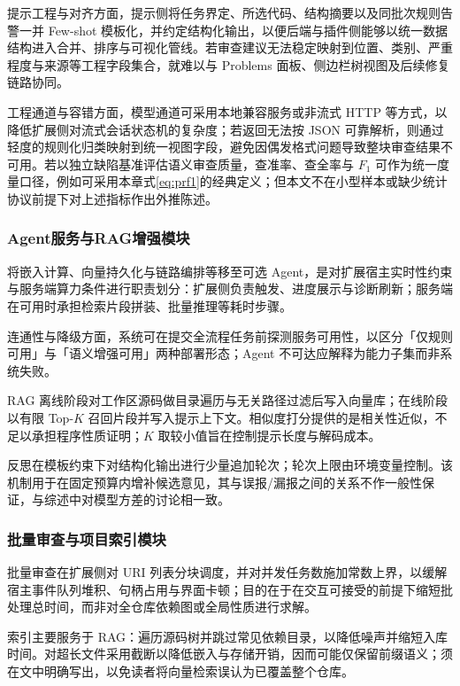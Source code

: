 提示工程与对齐方面，提示侧将任务界定、所选代码、结构摘要以及同批次规则告警一并 Few-shot 模板化，并约定结构化输出，以便后端与插件侧能够以统一数据结构进入合并、排序与可视化管线。若审查建议无法稳定映射到位置、类别、严重程度与来源等工程字段集合，就难以与 Problems 面板、侧边栏树视图及后续修复链路协同。

工程通道与容错方面，模型通道可采用本地兼容服务或非流式 HTTP 等方式，以降低扩展侧对流式会话状态机的复杂度；若返回无法按 JSON 可靠解析，则通过轻度的规则化归类映射到统一视图字段，避免因偶发格式问题导致整块审查结果不可用。若以独立缺陷基准评估语义审查质量，查准率、查全率与 $F_{1}$ 可作为统一度量口径，例如可采用本章式\eqref{eq:prf1}的经典定义；但本文不在小型样本或缺少统计协议前提下对上述指标作出外推陈述。

\subsubsection{Agent服务与RAG增强模块}

将嵌入计算、向量持久化与链路编排等移至可选 Agent，是对扩展宿主实时性约束与服务端算力条件进行职责划分：扩展侧负责触发、进度展示与诊断刷新；服务端在可用时承担检索片段拼装、批量推理等耗时步骤。

连通性与降级方面，系统可在提交全流程任务前探测服务可用性，以区分「仅规则可用」与「语义增强可用」两种部署形态；Agent 不可达应解释为能力子集而非系统失败。

RAG 离线阶段对工作区源码做目录遍历与无关路径过滤后写入向量库；在线阶段以有限 Top-$K$ 召回片段并写入提示上下文。相似度打分提供的是相关性近似，不足以承担程序性质证明；$K$ 取较小值旨在控制提示长度与解码成本\cite{lewis2020retrieval}。

反思在模板约束下对结构化输出进行少量追加轮次；轮次上限由环境变量控制。该机制用于在固定预算内增补候选意见，其与误报/漏报之间的关系不作一般性保证，与综述中对模型方差的讨论相一致\cite{hou2024llmse}。

\subsubsection{批量审查与项目索引模块}

批量审查在扩展侧对 URI 列表分块调度，并对并发任务数施加常数上界，以缓解宿主事件队列堆积、句柄占用与界面卡顿；目的在于在交互可接受的前提下缩短批处理总时间，而非对全仓库依赖图或全局性质进行求解。

索引主要服务于 RAG：遍历源码树并跳过常见依赖目录，以降低噪声并缩短入库时间。对超长文件采用截断以降低嵌入与存储开销，因而可能仅保留前缀语义；须在文中明确写出，以免读者将向量检索误认为已覆盖整个仓库。

